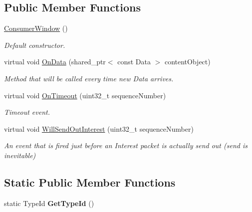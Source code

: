 \subsection*{Public Member Functions}
\begin{DoxyCompactItemize}
\item 
\hyperlink{classns3_1_1ndn_1_1ConsumerWindow_aca4a5a8e5fdb321126cb6e235ce59d65}{Consumer\+Window} ()\hypertarget{classns3_1_1ndn_1_1ConsumerWindow_aca4a5a8e5fdb321126cb6e235ce59d65}{}\label{classns3_1_1ndn_1_1ConsumerWindow_aca4a5a8e5fdb321126cb6e235ce59d65}

\begin{DoxyCompactList}\small\item\em Default constructor. \end{DoxyCompactList}\item 
virtual void \hyperlink{classns3_1_1ndn_1_1ConsumerWindow_a2a1df9fda4576e100d7d04658fd0311e}{On\+Data} (shared\+\_\+ptr$<$ const Data $>$ content\+Object)
\begin{DoxyCompactList}\small\item\em Method that will be called every time new Data arrives. \end{DoxyCompactList}\item 
virtual void \hyperlink{classns3_1_1ndn_1_1ConsumerWindow_a543852ddf580b55045b798f21f850e78}{On\+Timeout} (uint32\+\_\+t sequence\+Number)
\begin{DoxyCompactList}\small\item\em Timeout event. \end{DoxyCompactList}\item 
virtual void \hyperlink{classns3_1_1ndn_1_1ConsumerWindow_ae3a121e015d5470dc26d756ec620c111}{Will\+Send\+Out\+Interest} (uint32\+\_\+t sequence\+Number)
\begin{DoxyCompactList}\small\item\em An event that is fired just before an Interest packet is actually send out (send is inevitable) \end{DoxyCompactList}\end{DoxyCompactItemize}
\subsection*{Static Public Member Functions}
\begin{DoxyCompactItemize}
\item 
static Type\+Id {\bfseries Get\+Type\+Id} ()\hypertarget{classns3_1_1ndn_1_1ConsumerWindow_afec658d2d37faecb20f61ea138226e85}{}\label{classns3_1_1ndn_1_1ConsumerWindow_afec658d2d37faecb20f61ea138226e85}

\end{DoxyCompactItemize}
